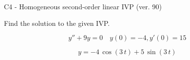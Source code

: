 \begin{exercise}
  \begin{exerciseTitle}C4 - Homogeneous second-order linear IVP (ver. 90)\end{exerciseTitle}
  \begin{exerciseStatement}
    
Find the solution to the given IVP.

    
\[y''+9y = 0 \hspace{1em} y(0) = -4 , y'(0) = 15\]

  \end{exerciseStatement}
  \begin{exerciseAnswer}
    
\[y= -4 \, \cos\left(3 \, t\right) + 5 \, \sin\left(3 \, t\right)\]

  \end{exerciseAnswer}
\end{exercise}